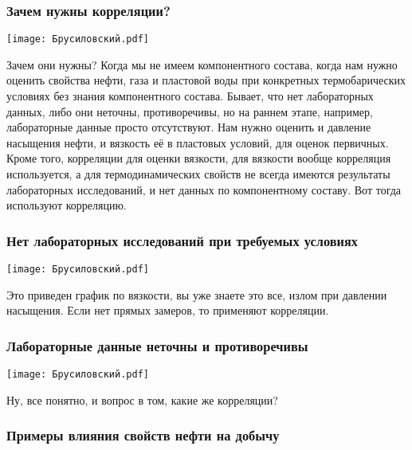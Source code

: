 \documentclass[main.tex]{subfiles}
\begin{document}
\subsubsection{Зачем нужны корреляции?}

\begin{center}
\texttt{[image: Брусиловский.pdf]}
\end{center}

Зачем они нужны?
Когда мы не имеем компонентного состава, когда нам нужно оценить свойства нефти, газа и пластовой воды при конкретных термобарических условиях без знания компонентного состава.
Бывает, что нет лабораторных данных, либо они неточны, противоречивы, но на раннем этапе, например, лабораторные данные просто отсутствуют.
Нам нужно оценить и давление насыщения нефти, и вязкость её в пластовых условий, для оценок первичных.
Кроме того, корреляции для оценки вязкости, для вязкости вообще корреляция используется, а для термодинамических свойств не всегда имеются результаты лабораторных исследований, и нет данных по компонентному составу.
Вот тогда используют корреляцию.

\subsubsection{Нет лабораторных исследований при требуемых условиях}

\begin{center}
\texttt{[image: Брусиловский.pdf]}
\end{center}

Это приведен график по вязкости, вы уже знаете это все, излом при давлении насыщения.
Если нет прямых замеров, то применяют корреляции.

\subsubsection{Лабораторные данные неточны и противоречивы}

\begin{center}
\texttt{[image: Брусиловский.pdf]}
\end{center}

Ну, все понятно, и вопрос в том, какие же корреляции?

\subsubsection{Примеры влияния свойств нефти на добычу}
\end{document}
